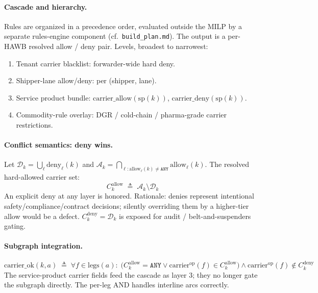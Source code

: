\documentclass[11pt,a4paper]{article}
\newcommand{\defeq}{\triangleq}
\theoremstyle{definition}
\begin{document}
\paragraph{Cascade and hierarchy.}
Rules are organized in a precedence order, evaluated outside the MILP by a
separate rules-engine component (cf.\ \texttt{build\_plan.md}). The output is
a per-HAWB resolved allow / deny pair. Levels, broadest to narrowest:
\begin{enumerate}[noitemsep]
  \item Tenant carrier blacklist: forwarder-wide hard deny.
  \item Shipper-lane allow/deny: per (shipper, lane).
  \item Service product bundle: $\text{carrier\_allow}(\text{sp}(k))$,
        $\text{carrier\_deny}(\text{sp}(k))$.
  \item Commodity-rule overlay: DGR / cold-chain / pharma-grade carrier
        restrictions.
\end{enumerate}

\paragraph{Conflict semantics: deny wins.}
Let $\mathcal{D}_k = \bigcup_{\ell} \text{deny}_\ell(k)$ and
$\mathcal{A}_k = \bigcap_{\ell : \text{allow}_\ell(k) \neq \texttt{ANY}} \text{allow}_\ell(k)$.
The resolved hard-allowed carrier set:
\begin{equation}
  C_k^{\text{allow}} \;\defeq\; \mathcal{A}_k \setminus \mathcal{D}_k
  \label{eq:carrier-allow}
\end{equation}
An explicit deny at any layer is honored. Rationale: denies represent
intentional safety/compliance/contract decisions; silently overriding them
by a higher-tier allow would be a defect. $C_k^{\text{deny}} = \mathcal{D}_k$
is exposed for audit / belt-and-suspenders gating.

\paragraph{Subgraph integration.}
\begin{equation}
  \text{carrier\_ok}(k, a) \;\defeq\;
    \forall f \in \text{legs}(a):\;
    \bigl(C_k^{\text{allow}} = \texttt{ANY} \vee \text{carrier}^{\text{op}}(f) \in C_k^{\text{allow}}\bigr)
    \wedge \text{carrier}^{\text{op}}(f) \notin C_k^{\text{deny}}
  \label{eq:carrier-ok-resolved}
\end{equation}
The service-product carrier fields feed the cascade as layer 3; they no
longer gate the subgraph directly. The per-leg AND handles interline arcs
correctly.
\end{document}
